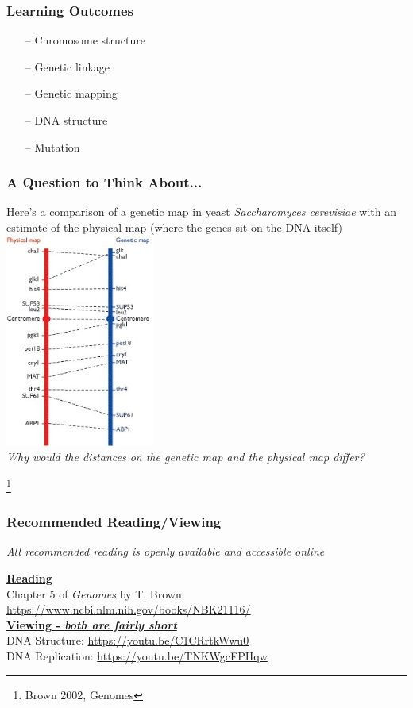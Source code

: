 \documentclass{beamer}
\newcommand\blfootnote[1]{%
	\begingroup
	\renewcommand\thefootnote{}\footnote{#1}%
	\addtocounter{footnote}{-1}%
	\endgroup
}
\begin{document}
\begin{frame}
	
	\frametitle{Learning Outcomes}
	
	\Large
	\begin{itemize}
		\item[--]   Chromosome structure
		\item[--]	Genetic linkage
		\item [--]  Genetic mapping
		\item[--]	DNA structure
		\item[--]	Mutation
	\end{itemize}
	
\end{frame}

	
	\begin{frame}
		
	\frametitle{A Question to Think About...}

		Here's a comparison of a genetic map in yeast \textit{Saccharomyces cerevisiae} with an estimate of the physical map (where the genes sit on the DNA itself)\\
		
		\centering	\includegraphics[keepaspectratio, width  =0.37\textwidth]{img/physical_v_genetic} \\
		
		
\textit{		Why would the distances on the genetic map and the physical map differ?}

\blfootnote{Brown 2002, Genomes}
	\end{frame}
	
	
\begin{frame}
	\frametitle{Recommended Reading/Viewing}
	\textit{All recommended reading is openly available and accessible online}
	
		\vspace{30pt}
	\vspace{10pt}
	\underline{\textbf{Reading}}\\
	
	Chapter 5 of \textit{Genomes} by T. Brown. \url{https://www.ncbi.nlm.nih.gov/books/NBK21116/}\\
	\vspace{10pt}
	\underline{\textbf{Viewing - \textit{both are fairly short}}}\\
		\vspace{10pt}
	DNA Structure: \url{https://youtu.be/C1CRrtkWwu0}\\	
	DNA Replication: \url{https://youtu.be/TNKWgcFPHqw}
\end{frame}	
\end{document}
